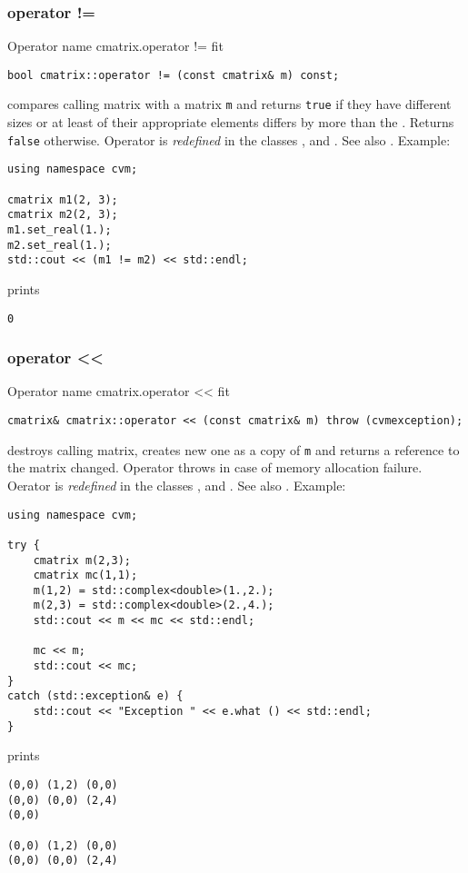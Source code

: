 \subsubsection{operator !=}
Operator%
\pdfdest name {cmatrix.operator !=} fit
\begin{verbatim}
bool cmatrix::operator != (const cmatrix& m) const;
\end{verbatim}
compares  calling matrix with a matrix \verb"m"
and returns \verb"true" if they have different sizes
or at least of their appropriate elements
differs by more than the
.
Returns \verb"false" otherwise.
Operator is \emph{redefined} in the classes
,  
and .
See also .
Example:
\begin{Verbatim}
using namespace cvm;

cmatrix m1(2, 3);
cmatrix m2(2, 3);
m1.set_real(1.);
m2.set_real(1.);
std::cout << (m1 != m2) << std::endl;
\end{Verbatim}
prints
\begin{Verbatim}
0
\end{Verbatim}
\newpage



\subsubsection{operator <{}<}
Operator%
\pdfdest name {cmatrix.operator <<} fit
\begin{verbatim}
cmatrix& cmatrix::operator << (const cmatrix& m) throw (cvmexception);
\end{verbatim}
destroys  calling matrix, creates  new one as a copy of \verb"m"
and returns a reference to
the matrix changed.
Operator throws  
in case of memory allocation failure.
Oerator is \emph{redefined} in the classes
,  
and .
See also .
Example:
\begin{Verbatim}
using namespace cvm;

try {
    cmatrix m(2,3);
    cmatrix mc(1,1);
    m(1,2) = std::complex<double>(1.,2.);
    m(2,3) = std::complex<double>(2.,4.);
    std::cout << m << mc << std::endl;

    mc << m;
    std::cout << mc;
}
catch (std::exception& e) {
    std::cout << "Exception " << e.what () << std::endl;
}
\end{Verbatim}
prints
\begin{Verbatim}
(0,0) (1,2) (0,0)
(0,0) (0,0) (2,4)
(0,0)

(0,0) (1,2) (0,0)
(0,0) (0,0) (2,4)
\end{Verbatim}
\newpage




